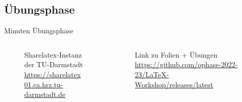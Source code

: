 \documentclass[
    ngerman,
    accentcolor=3b,
    dark_mode,
    fontsize= 12pt,
    a4paper,
    aspectratio=169,
    colorback=true,
    fancy_row_colors,
    leqno,
    fleqn,
    boxarc=3pt,
    fleqn,
]{algoslides}
\begin{document}

    \subsection{Übungsphase}
    \begin{frame}[c]
        \slidehead{}
         Minuten Übungsphase
        \begin{columns}[c]
            \begin{column}{.5\textwidth}
                \begin{figure}
                    \centering
                    \caption{Sharelatex-Instanz der TU-Darmstadt\\\url{https://sharelatex01.ca.hrz.tu-darmstadt.de}}
                \end{figure}
            \end{column}%
            \begin{column}{.5\textwidth}
                \begin{figure}
                    \centering
                    \caption{Link zu Folien + Übungen\\\url{https://github.com/ophase-2022-23/LaTeX-Workshop/releases/latest}}
                \end{figure}
            \end{column}
        \end{columns}
    \end{frame}
\end{document}
